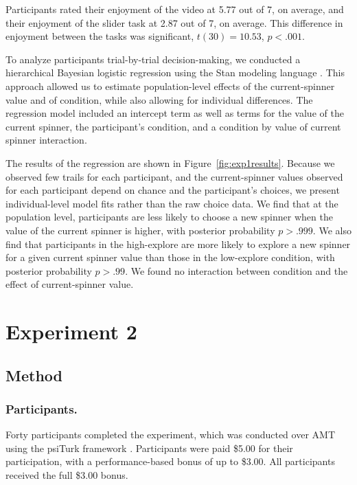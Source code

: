 \documentclass[10pt,letterpaper]{article}
\begin{document}
Participants rated their enjoyment of the video at 5.77 out of 7, on average,
and their enjoyment of the slider task at 2.87 out of 7, on average. This
difference in enjoyment between the tasks was significant, $t(30)=10.53$, $p<.001$.

To analyze participants trial-by-trial decision-making, we conducted a hierarchical
Bayesian logistic regression using the Stan modeling language \citep{stan-software:2015}.
This approach allowed us to estimate population-level effects of the
current-spinner value and of condition, while also allowing for individual
differences. The regression model included an intercept term as well as terms
for the value of the current spinner, the participant's condition, and a
condition by value of current spinner interaction.

The results of the regression are shown in Figure~\ref{fig:exp1results}.
Because we observed few trails for each participant, and the current-spinner
values observed for each participant depend on chance and the participant's
choices, we present individual-level model fits rather than the raw choice data.
We find that at the population level, participants are less likely to choose a
new spinner when the value of the current spinner is higher, with posterior
probability $p>.999$. We also find that participants in the high-explore are more likely to explore a new spinner for a
given current spinner value than those in the low-explore condition, with
posterior probability $p>.99$. We found no interaction between condition and the
effect of current-spinner value.

\section{Experiment 2}

\subsection{Method}

\subsubsection{Participants.}

Forty participants completed the experiment, which was conducted over
AMT using the psiTurk framework \citep{Gureckis2015a}.
Participants were paid \$5.00 for their participation, with a performance-based
bonus of up to \$3.00. All participants received the full \$3.00 bonus.
\end{document}
